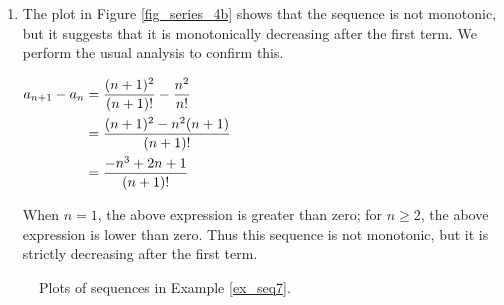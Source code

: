 \begin{example}
\begin{enumerate}

\item		The plot in Figure \ref{fig_series_4b} shows that the sequence is not monotonic, but it suggests that it is monotonically decreasing after the first term. We perform the usual analysis to confirm this.

					\hfill $\displaystyle \begin{aligned}[t]	
						a_{n+1}-a_n &= \frac{(n+1)^2}{(n+1)!} - \frac{n^2}{n!} \\
								&= \frac{(n+1)^2-n^2(n+1)}{(n+1)!} \\
								&=	\frac{-n^3+2n+1}{(n+1)!}
					\end{aligned}$\hfill \null
					
When $n=1$, the above expression is greater than zero; for $n\geq 2$, the above expression is lower than zero. Thus this sequence is not monotonic, but it is strictly decreasing after the first term.
\end{enumerate}

\begin{figure}[H]
\centering
\qquad
{}
\caption{Plots of sequences in Example \ref{ex_seq7}.}
\end{figure}
\end{example}



